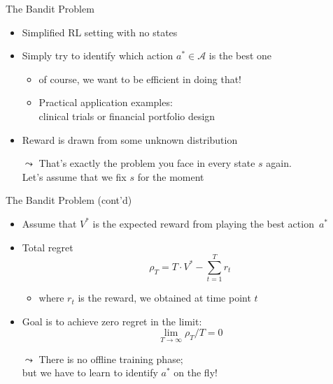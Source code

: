 \begin{frame}[c]{The Bandit Problem}

\begin{itemize}
	\item Simplified RL setting with \alert{no states}
	\item Simply try to identify which action $a^* \in \mathcal{A}$ is the best one
	\begin{itemize}
		\item of course, we want to be efficient in doing that!
		\item Practical application examples:\\ clinical trials or financial portfolio design
	\end{itemize}
	\item Reward is drawn from some unknown distribution
	\bigskip
	\pause
	\item[$\leadsto$] That's exactly the problem you face in every state $s$ again.\\ Let's assume that we fix $s$ for the moment
\end{itemize}

\end{frame}
\begin{frame}[c]{The Bandit Problem (cont'd)}
	
	\begin{itemize}
		\item Assume that $V^*$ is the expected reward from playing the best action~$a^*$
		\item Total regret
		$$\rho_T = T \cdot V^* - \sum^T_{t=1} r_t $$
		\begin{itemize}
			\item where $r_t$ is the reward, we obtained at time point $t$
		\end{itemize}
	\medskip
		\item Goal is to achieve zero regret in the limit:
		$$\lim_{T \to \infty} \rho_T / T = 0$$	
		\item[$\leadsto$] There is no offline training phase;\\ but we have to learn to identify $a^*$ on the fly!
	\end{itemize}
	
\end{frame}
